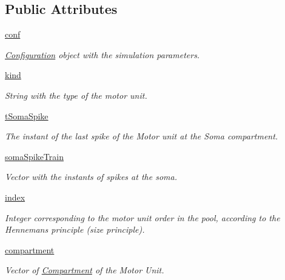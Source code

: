 \subsection*{Public Attributes}
\begin{DoxyCompactItemize}
\item 
\hyperlink{class_motor_unit_1_1_motor_unit_a10539f5129881188923f3a3a164d2cba}{conf}
\begin{DoxyCompactList}\small\item\em \hyperlink{namespace_configuration}{Configuration} object with the simulation parameters. \end{DoxyCompactList}\item 
\hyperlink{class_motor_unit_1_1_motor_unit_a08ed5171ba46e0b1ea5bc7d08296c612}{kind}
\begin{DoxyCompactList}\small\item\em String with the type of the motor unit. \end{DoxyCompactList}\item 
\hyperlink{class_motor_unit_1_1_motor_unit_abca82ec2c7312bb475989bb45e82ca28}{t\+Soma\+Spike}
\begin{DoxyCompactList}\small\item\em The instant of the last spike of the Motor unit at the Soma compartment. \end{DoxyCompactList}\item 
\hyperlink{class_motor_unit_1_1_motor_unit_a8c86d98daa6c509e226ab165fa92515f}{soma\+Spike\+Train}
\begin{DoxyCompactList}\small\item\em Vector with the instants of spikes at the soma. \end{DoxyCompactList}\item 
\hyperlink{class_motor_unit_1_1_motor_unit_a4f3205a9273aabb92d425992d91a1848}{index}
\begin{DoxyCompactList}\small\item\em Integer corresponding to the motor unit order in the pool, according to the Henneman\textquotesingle{}s principle (size principle). \end{DoxyCompactList}\item 
\hyperlink{class_motor_unit_1_1_motor_unit_a6d4da7327031b3cb9c7041a4a790e524}{compartment}
\begin{DoxyCompactList}\small\item\em Vector of \hyperlink{namespace_compartment}{Compartment} of the Motor Unit. \end{DoxyCompactList}\item 

\end{DoxyCompactItemize}
